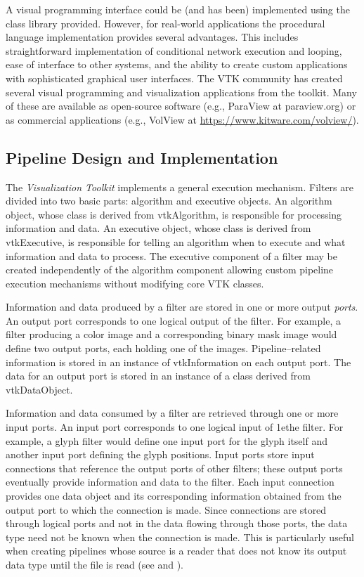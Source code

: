 A visual programming interface could be (and has been) implemented using the class library provided. However, for real-world applications the procedural language implementation provides several advantages. This includes straightforward implementation of conditional network execution and looping, ease of interface to other systems, and the ability to create custom applications with sophisticated graphical user interfaces. The VTK community has created several visual programming and visualization applications from the toolkit. Many of these are available as open-source software (e.g., ParaView at paraview.org) or as commercial applications (e.g., VolView at \href{https://www.kitware.com/volview/}{https://www.kitware.com/volview/}).

\subsection{Pipeline Design and Implementation}
\label{subsec:pipeline_design_implementation}

The \emph{Visualization Toolkit} implements a general execution mechanism. Filters are divided into two basic parts: algorithm and executive objects. An algorithm object, whose class is derived from vtkAlgorithm, is responsible for processing information and data. An executive object, whose class is derived from vtkExecutive, is responsible for telling an algorithm when to execute and what information and data to process. The executive component of a filter may be created independently of the algorithm component allowing custom pipeline execution mechanisms without modifying core VTK classes.

Information and data produced by a filter are stored in one or more output \emph{ports}. An output port corresponds to one logical output of the filter. For example, a filter producing a color image and a corresponding binary mask image would define two output ports, each holding one of the images. Pipeline--related information is stored in an instance of vtkInformation on each output port. The data for an output port is stored in an instance of a class derived from vtkDataObject.

Information and data consumed by a filter are retrieved through one or more input ports. An input port corresponds to one logical input of 1ethe filter. For example, a glyph filter would define one input port for the glyph itself and another input port defining the glyph positions. Input ports store input connections that reference the output ports of other filters; these output ports eventually provide information and data to the filter. Each input connection provides one data object and its corresponding information obtained from the output port to which the connection is made. Since connections are stored through logical ports and not in the data flowing through those ports, the data type need not be known when the connection is made. This is particularly useful when creating pipelines whose source is a reader that does not know its output data type until the file is read (see  and ).

